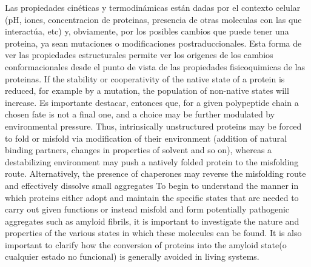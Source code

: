 Las propiedades cinéticas y termodinámicas están dadas por el contexto celular (pH, iones, concentracion de proteinas, presencia de otras moleculas con las que interactúa, etc) y, 
obviamente, por los posibles cambios que puede tener una proteina, ya sean mutaciones o modificaciones postraduccionales.
Esta forma de ver las propiedades estructurales permite ver los origenes de los cambios conformacionales desde el punto de vista de las propiedades fisicoquimicas de las proteinas.
If the stability or cooperativity of the native state of a protein is reduced, for example by a mutation, the population of non-native states will increase.
Es importante destacar, entonces que, for a given polypeptide chain a chosen fate is not a final one, and a choice may be further modulated by environmental pressure. 
Thus, intrinsically unstructured proteins may be forced to fold or misfold via modification of their environment (addition of natural binding partners, changes in properties of solvent and so on), 
whereas a destabilizing environment may push a natively folded protein to the misfolding route. Alternatively, the presence of chaperones may reverse the misfolding route and effectively dissolve small aggregates
To begin to understand the manner in which proteins either adopt and maintain the specific states that are needed to carry out given functions or instead misfold
and form potentially pathogenic aggregates such as amyloid fibrils, it is important to investigate the nature and properties of the various states in which these molecules
can be found. 
It is also important to clarify how the conversion of proteins into the amyloid state(o cualquier estado no funcional) is generally avoided in living systems.  
% 





















